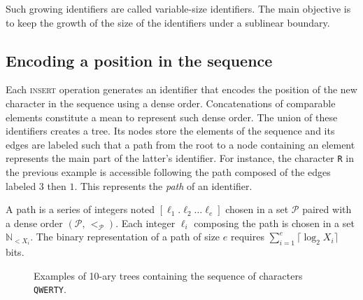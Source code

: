 Such growing identifiers are called variable-size identifiers. The main
objective is to keep the growth of the size of the identifiers under a sublinear
boundary.

\subsection{Encoding a position in the sequence}
\label{subsec:variable}

Each \textsc{insert} operation generates an identifier that encodes the position
of the new character in the sequence using a dense order. Concatenations of
comparable elements constitute a mean to represent such dense order.
The union of these identifiers creates a tree. Its nodes store the elements of
the sequence and its edges are labeled such that a path from the root to a node
containing an element represents the main part of the latter's identifier. For
instance, the character \texttt{R} in the previous example is accessible
following the path composed of the edges labeled $3$ then $1$.  This represents
the \emph{path} of an identifier.



\begin{definition}[Path]
  A path is a series of integers noted $[\ell_1.\ell_2\ldots \ell_e]$ chosen in a
  set $\mathcal{P}$ paired with a dense order $(\mathcal{P},\, <_\mathcal{P})$.
  Each integer $\ell_i$ composing the path is chosen in a set
  $\mathbb{N}_{<X_i}$. The binary representation of a path of size $e$ requires
  $\textstyle \sum\nolimits_{i=1}^e \lceil \log_2 X_i\rceil$ bits.
\end{definition}


\begin{figure*}
  \centering
  \hspace{20pt}
  \caption{Examples of 10-ary trees containing the sequence of characters
    \texttt{QWERTY}.}
\end{figure*}

